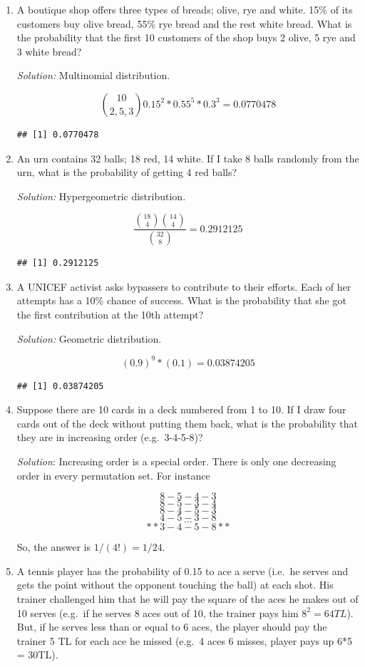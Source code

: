 \documentclass[]{book}
\theoremstyle{definition}
\theoremstyle{definition}
\theoremstyle{definition}
\theoremstyle{remark}
\begin{document}
\begin{enumerate}
\def\labelenumi{\arabic{enumi}.}
\item
  A boutique shop offers three types of breads; olive, rye and white.
  15\% of its customers buy olive bread, 55\% rye bread and the rest
  white bread. What is the probability that the first 10 customers of
  the shop buys 2 olive, 5 rye and 3 white bread?

  \emph{Solution:} Multinomial distribution.

  \[\binom{10}{2,5,3} 0.15^2 * 0.55^5 * 0.3^3 = 0.0770478\]

\begin{verbatim}
## [1] 0.0770478
\end{verbatim}
\item
  An urn contains 32 balls; 18 red, 14 white. If I take 8 balls randomly
  from the urn, what is the probability of getting 4 red balls?

  \emph{Solution:} Hypergeometric distribution.

  \[\dfrac{\binom{18}{4}\binom{14}{4}}{\binom{32}{8}} = 0.2912125\]

\begin{verbatim}
## [1] 0.2912125
\end{verbatim}
\item
  A UNICEF activist asks bypassers to contribute to their efforts. Each
  of her attempts has a 10\% chance of success. What is the probability
  that she got the first contribution at the 10th attempt?

  \emph{Solution:} Geometric distribution.

  \[ (0.9)^9 * (0.1) = 0.03874205\]

\begin{verbatim}
## [1] 0.03874205
\end{verbatim}
\item
  Suppose there are 10 cards in a deck numbered from 1 to 10. If I draw
  four cards out of the deck without putting them back, what is the
  probability that they are in increasing order (e.g.~3-4-5-8)?

  \emph{Solution}: Increasing order is a special order. There is only
  one decreasing order in every permutation set. For instance

  \[8-5-4-3\] \[8-5-3-4\] \[8-4-5-3\] \[4-5-3-8\] \[\dots\]
  \[**3-4-5-8**\]

  So, the answer is \(1/(4!) = 1/24\).
\item
  A tennis player has the probability of 0.15 to ace a serve (i.e.~he
  serves and gets the point without the opponent touching the ball) at
  each shot. His trainer challenged him that he will pay the square of
  the aces he makes out of 10 serves (e.g.~if he serves 8 aces out of
  10, the trainer pays him \(8^2 = 64TL\)). But, if he serves less than
  or equal to 6 aces, the player should pay the trainer 5 TL for each
  ace he missed (e.g.~4 aces 6 misses, player pays up 6*5 = 30TL).


\end{enumerate}
\end{document}
